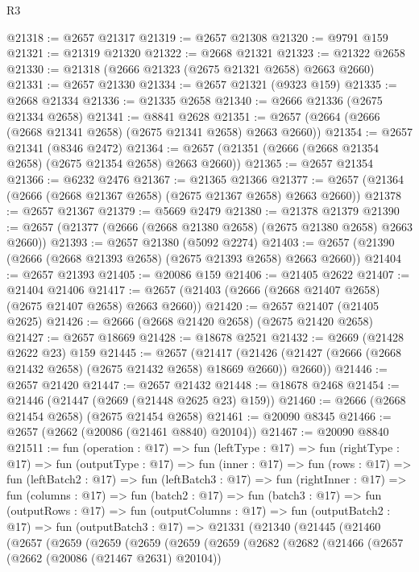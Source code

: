 \begin{lexlean}{R3}
\begin{coremodule}
@21318 := @2657 @21317
@21319 := @2657 @21308
@21320 := @9791 @159
@21321 := @21319 @21320
@21322 := @2668 @21321
@21323 := @21322 @2658
@21330 := @21318 (@2666 @21323 (@2675 @21321 @2658) @2663 @2660)
@21331 := @2657 @21330
@21334 := @2657 @21321 (@9323 @159)
@21335 := @2668 @21334
@21336 := @21335 @2658
@21340 := @2666 @21336 (@2675 @21334 @2658)
@21341 := @8841 @2628
@21351 := @2657 (@2664 (@2666 (@2668 @21341 @2658) (@2675 @21341 @2658) @2663 @2660))
@21354 := @2657 @21341 (@8346 @2472)
@21364 := @2657 (@21351 (@2666 (@2668 @21354 @2658) (@2675 @21354 @2658) @2663 @2660))
@21365 := @2657 @21354
@21366 := @6232 @2476
@21367 := @21365 @21366
@21377 := @2657 (@21364 (@2666 (@2668 @21367 @2658) (@2675 @21367 @2658) @2663 @2660))
@21378 := @2657 @21367
@21379 := @5669 @2479
@21380 := @21378 @21379
@21390 := @2657 (@21377 (@2666 (@2668 @21380 @2658) (@2675 @21380 @2658) @2663 @2660))
@21393 := @2657 @21380 (@5092 @2274)
@21403 := @2657 (@21390 (@2666 (@2668 @21393 @2658) (@2675 @21393 @2658) @2663 @2660))
@21404 := @2657 @21393
@21405 := @20086 @159
@21406 := @21405 @2622
@21407 := @21404 @21406
@21417 := @2657 (@21403 (@2666 (@2668 @21407 @2658) (@2675 @21407 @2658) @2663 @2660))
@21420 := @2657 @21407 (@21405 @2625)
@21426 := @2666 (@2668 @21420 @2658) (@2675 @21420 @2658)
@21427 := @2657 @18669
@21428 := @18678 @2521
@21432 := @2669 (@21428 @2622 @23) @159
@21445 := @2657
    (@21417 (@21426 (@21427 (@2666 (@2668 @21432 @2658) (@2675 @21432 @2658) @18669 @2660)) @2660))
@21446 := @2657 @21420
@21447 := @2657 @21432
@21448 := @18678 @2468
@21454 := @21446 (@21447 (@2669 (@21448 @2625 @23) @159))
@21460 := @2666 (@2668 @21454 @2658) (@2675 @21454 @2658)
@21461 := @20090 @8345
@21466 := @2657 (@2662 (@20086 (@21461 @8840) @20104))
@21467 := @20090 @8840
@21511 := fun (operation : @17) =>
  fun (leftType : @17) =>
  fun (rightType : @17) =>
  fun (outputType : @17) =>
  fun (inner : @17) =>
  fun (rows : @17) =>
  fun (leftBatch2 : @17) =>
  fun (leftBatch3 : @17) =>
  fun (rightInner : @17) =>
  fun (columns : @17) =>
  fun (batch2 : @17) =>
  fun (batch3 : @17) =>
  fun (outputRows : @17) =>
  fun (outputColumns : @17) =>
  fun (outputBatch2 : @17) =>
  fun (outputBatch3 : @17) =>
  @21331
    (@21340
      (@21445
        (@21460
          (@2657
            (@2659
              (@2659
                (@2659
                  (@2659
                    (@2659
                      (@2682
                        (@2682
                          (@21466
                            (@2657
                              (@2662 (@20086 (@21467 @2631) @20104))

\end{coremodule}
\end{lexlean}
